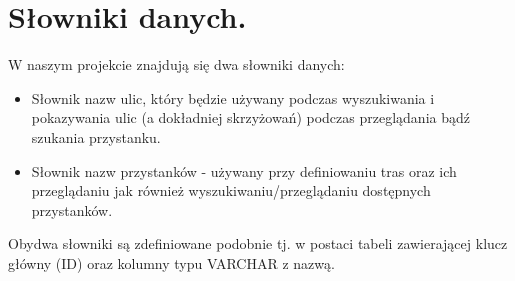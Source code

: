 \section{Słowniki danych.}
W naszym projekcie znajdują się dwa słowniki danych:
\begin{itemize}
 \item Słownik nazw ulic, który będzie używany podczas wyszukiwania i pokazywania ulic (a dokładniej skrzyżowań) podczas przeglądania bądź szukania przystanku.
    \item Słownik nazw przystanków - używany przy definiowaniu tras oraz ich przeglądaniu jak również wyszukiwaniu/przeglądaniu dostępnych przystanków.
\end{itemize}

Obydwa słowniki są zdefiniowane podobnie tj. w postaci tabeli zawierającej klucz główny (ID) oraz kolumny typu VARCHAR z nazwą.
